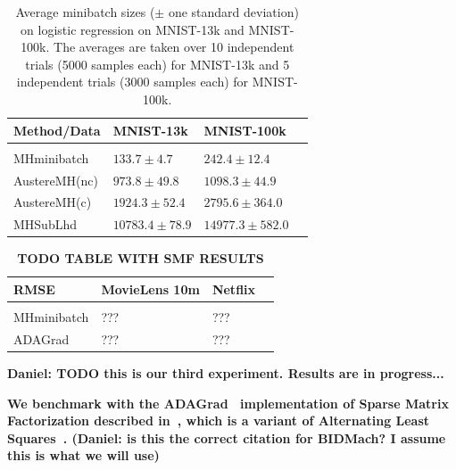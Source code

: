 \documentclass[letterpaper]{article}
\begin{document}
\begin{table}[t]
\caption{Average minibatch sizes ($\pm$ one standard deviation) on logistic
regression on MNIST-13k and MNIST-100k.  The averages are taken over 10
independent trials (5000 samples each) for MNIST-13k and 5 independent trials
(3000 samples each) for MNIST-100k.}
\small %
\label{tab:logistic}
\vskip 0.15in
\begin{center}
\begin{tabular}{l l l l}
\textbf{Method/Data} & \textbf{MNIST-13k} & \textbf{MNIST-100k}  \\
\hline \\
{\sc MHminibatch}   & $133.7\pm 4.7$    & $242.4 \pm 12.4$ \\
{\sc AustereMH(nc)} & $973.8\pm 49.8$   & $1098.3 \pm 44.9$ \\
{\sc AustereMH(c)}  & $1924.3\pm 52.4$  & $2795.6 \pm 364.0$ \\
{\sc MHSubLhd}      & $10783.4\pm 78.9$ & $14977.3 \pm 582.0$ \\
\end{tabular}
\end{center}
\vskip -0.1in
\end{table}


\begin{table}[t]
\caption{\textbf{TODO TABLE WITH SMF RESULTS}}
\small %
\label{tab:smf}
\vskip 0.15in
\begin{center}
\begin{tabular}{l l l l}
\textbf{RMSE} & \textbf{MovieLens 10m} & \textbf{Netflix}  \\
\hline \\
{\sc MHminibatch} & ??? & ??? & \\
ADAGrad           & ??? & ??? & \\
\end{tabular}
\end{center}
\vskip -0.1in
\end{table}

\textbf{Daniel: TODO this is our third experiment. Results are in progress...}

\textbf{We benchmark with the ADAGrad~\citep{adagrad} implementation of Sparse
Matrix Factorization described in~\citep{Canny:2013:BDA:2487575.2487677}, which
is a variant of Alternating Least Squares~\citep{Koren:2009:MFT:1608565.1608614}.
(Daniel: is this the correct citation for BIDMach? I assume this is what we will
use)}
\end{document}
